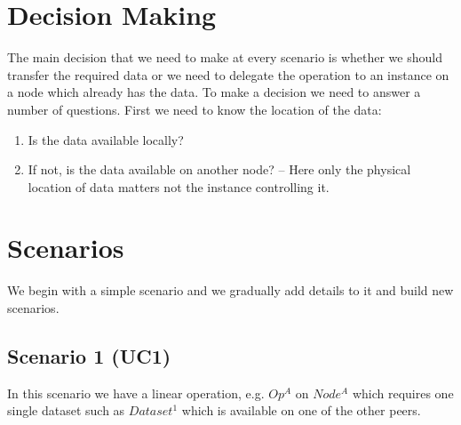 


\section{Decision Making}
The main decision that we need to make at every scenario is whether we should transfer the required data or we
need to delegate the operation to an instance on a node which already has the data. To make a decision we need to
answer a number of questions. First we need to know the location of the data:

\begin{enumerate}
\item Is the data available locally?
\item If not, is the data available on another node? -- Here only the physical location of data matters not the instance
controlling it.
\end{enumerate}


\section{Scenarios}
We begin with a simple scenario and we gradually add details to it and build new scenarios.

\subsection{Scenario 1 (UC1)}
In this scenario we have a linear operation, e.g. \(Op^A\) on \(Node^A\) which
requires one single dataset such as \( Dataset^1 \) which is available on one of the other peers.


